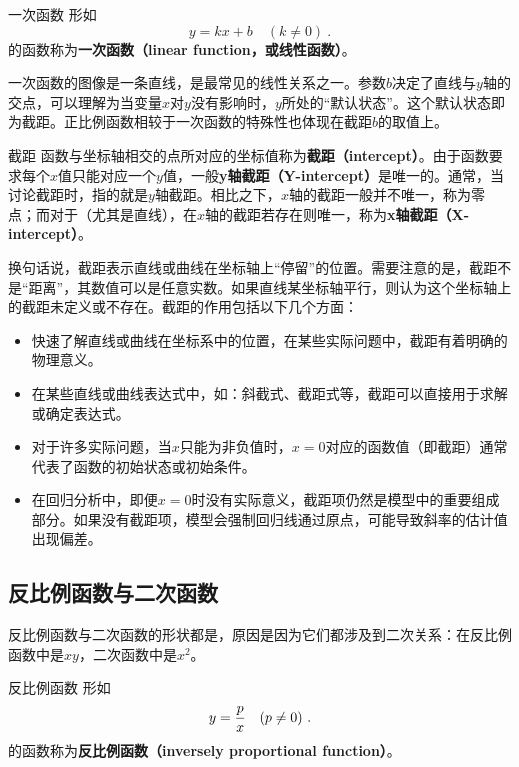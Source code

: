 \begin{definition}{一次函数}
形如
\begin{equation}
y = kx+b\quad(k\neq0)~.
\end{equation}
的函数称为\textbf{一次函数（linear function，或线性函数）}。
\end{definition}

一次函数的图像是一条直线，是最常见的线性关系之一。参数$b$决定了直线与$y$轴的交点，可以理解为当变量$x$对$y$没有影响时，$y$所处的“默认状态”。这个默认状态即为截距。正比例函数相较于一次函数的特殊性也体现在截距$b$的取值上。

\begin{definition}{截距}
函数与坐标轴相交的点所对应的坐标值称为\textbf{截距（intercept）}。由于函数要求每个$x$值只能对应一个$y$值，一般\textbf{y轴截距（Y-intercept）}是唯一的。通常，当讨论截距时，指的就是$y$轴截距。相比之下，$x$轴的截距一般并不唯一，称为零点；而对于（尤其是直线），在$x$轴的截距若存在则唯一，称为\textbf{x轴截距（X-intercept）}。
\end{definition}

换句话说，截距表示直线或曲线在坐标轴上“停留”的位置。需要注意的是，截距不是“距离”，其数值可以是任意实数。如果直线某坐标轴平行，则认为这个坐标轴上的截距未定义或不存在。截距的作用包括以下几个方面：
\begin{itemize}
\item 快速了解直线或曲线在坐标系中的位置，在某些实际问题中，截距有着明确的物理意义。
\item 在某些直线或曲线表达式中，如：斜截式、截距式等，截距可以直接用于求解或确定表达式。
\item 对于许多实际问题，当$x$只能为非负值时，$x=0$对应的函数值（即截距）通常代表了函数的初始状态或初始条件。
\item 在回归分析中，即便$x=0$时没有实际意义，截距项仍然是模型中的重要组成部分。如果没有截距项，模型会强制回归线通过原点，可能导致斜率的估计值出现偏差。
\end{itemize}

\subsection{反比例函数与二次函数}

反比例函数与二次函数的形状都是，原因是因为它们都涉及到二次关系：在反比例函数中是$xy$，二次函数中是$x^2$。

\begin{definition}{反比例函数}
形如
\begin{equation}
y={p\over x}\quad(p\neq0)~.
\end{equation}
的函数称为\textbf{反比例函数（inversely proportional function）}。
\end{definition}

